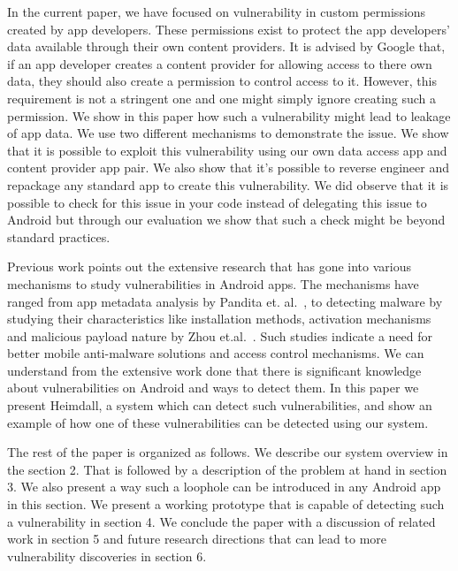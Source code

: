 In the current paper, we have focused on vulnerability in custom permissions created by app developers. These permissions exist to protect the app developers' data available through their own content providers. It is advised by Google that, if an app developer creates a content provider for allowing access to there own data, they should also create a permission to control access to it. However, this requirement is not a stringent one and one might simply ignore creating such a permission. We show in this paper how such a vulnerability might lead to leakage of app data. We use two different mechanisms to demonstrate the issue. We show that it is possible to exploit this vulnerability using our own data access app and content provider app pair. We also show that it's possible to reverse engineer and repackage any standard app to create this vulnerability. We did observe that it is possible to check for this issue in your code instead of delegating this issue to Android but through our evaluation we show that such a check might be beyond standard practices. 

Previous work points out the extensive research that has gone into various mechanisms to study vulnerabilities in Android apps. The mechanisms have ranged from app metadata analysis by Pandita et. al.~\cite{Pandita2013Whyper}, to detecting malware by studying their characteristics like installation methods, activation mechanisms and malicious payload nature by Zhou et.al.~\cite{Zhou2012MalwareGenomeProject}. Such studies indicate a need for better mobile anti-malware solutions and access control mechanisms. We can understand from the extensive work done that there is significant knowledge about vulnerabilities on Android and ways to detect them. In this paper we present Heimdall, a system which can detect such vulnerabilities, and show an example of how one of these vulnerabilities can be detected using our system. 

The rest of the paper is organized as follows. We describe our system overview in the section 2. That is followed by a description of the problem at hand in section 3. We also present a way such a loophole can be introduced in any Android app in this section. We present a working prototype that is capable of detecting such a vulnerability in section 4. We conclude the paper with a discussion of related work in section 5 and future research directions that can lead to more vulnerability discoveries in section 6.


